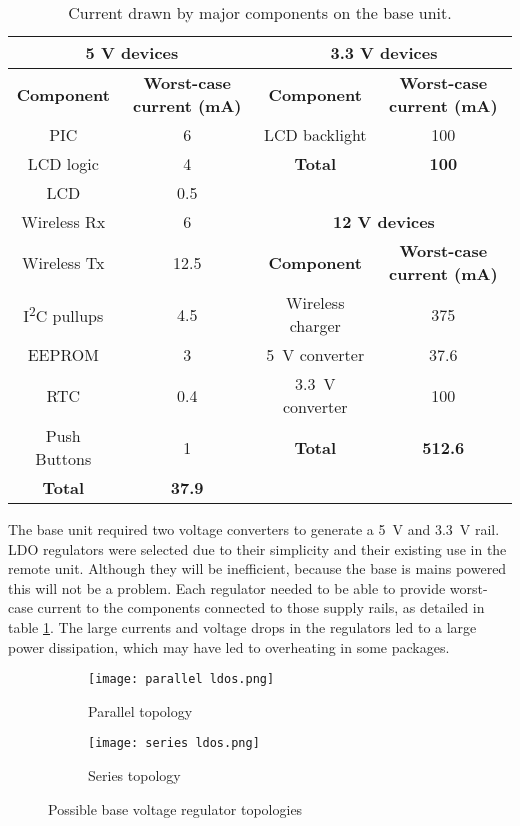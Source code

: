 \begin{table}[htb]
	\begin{center}
	\caption{Current drawn by major components on the base unit.}
	\label{tab: base current}
	\begin{tabular}{|c|c|c|c|}
	\hline
	\multicolumn{2}{|c}{\textbf{5 V devices}} & \multicolumn{2}{|c|}{\textbf{3.3 V devices}}\\
	\hline
	\textbf{Component} & \textbf{Worst-case current (mA)} & \textbf{Component} & \textbf{Worst-case current (mA)} \\
	\hline
	PIC & 6 & LCD backlight & 100 \\
	\cline{3-4}
	LCD logic & 4 & \textbf{Total} & \textbf{100}\\
	\cline{3-4}
	LCD & 0.5 & \multicolumn{2}{c}{} \\
	\cline{3-4}
	Wireless Rx & 6 &  \multicolumn{2}{c|}{\textbf{12 V devices}} \\
	\cline{3-4}
	Wireless Tx & 12.5 & \textbf{Component} & \textbf{Worst-case current (mA)}  \\
	\cline{3-4}
	I\textsuperscript{2}C pullups & 4.5 & Wireless charger & 375 \\
	EEPROM & 3 & \SI{5}{\volt} converter & 37.6 \\
	RTC & 0.4 & \SI{3.3}{\volt} converter & 100 \\
	\cline{3-4}
	Push Buttons & 1 & \textbf{Total} & \textbf{512.6}  \\
	\hline
	\textbf{Total} & \textbf{37.9}  \\
	\cline{1-2}
	\end{tabular}
	\end{center}
\end{table}

The base unit required two voltage converters to generate a \SI{5}{\volt} and \SI{3.3}{\volt} rail. LDO regulators were selected due to their simplicity and their existing use in the remote unit. Although they will be inefficient, because the base is mains powered this will not be a problem. Each regulator needed to be able to provide worst-case current to the components connected to those supply rails, as detailed in table \ref{tab: base current}. The large currents and voltage drops in the regulators led to a large power dissipation, which may have led to overheating in some packages.\\

\begin{figure}[htb]
	\centering
	\begin{subfigure}[b]{0.35\linewidth}
		\texttt{[image: parallel ldos.png]}
		\caption{Parallel topology}
		\label{fig: parallel ldos}
	\end{subfigure}
	\begin{subfigure}[b]{0.5\linewidth}
		\texttt{[image: series ldos.png]}
		\caption{Series topology}
		\label{fig: series ldos}
	\end{subfigure}
	\caption{Possible base voltage regulator topologies}
	\label{fig: base ldos}
\end{figure}

